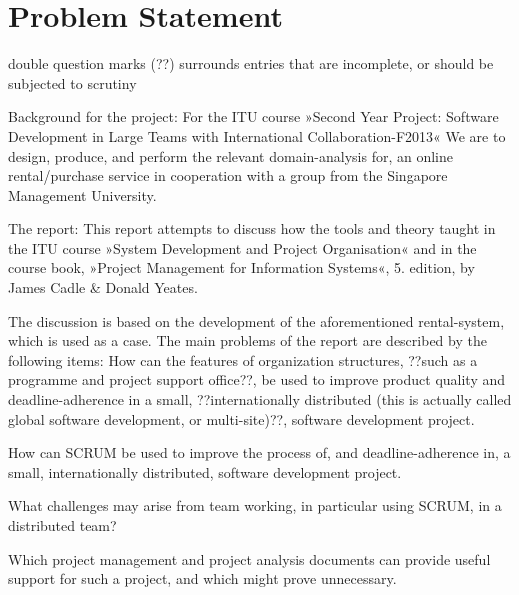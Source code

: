 \section{Problem Statement}
\label{sec:problemstatement}
double question marks (??) surrounds entries that are incomplete, or should be
subjected to scrutiny

Background for the project:
For the ITU course »Second Year Project: Software Development in Large Teams with
International Collaboration-F2013«
We are to design, produce, and perform the relevant domain-analysis for,
an online rental/purchase service in cooperation with a group from the Singapore
Management University.

The report:
This report attempts to discuss how the tools and theory taught in the
ITU course »System Development and Project Organisation« and in the
course book, »Project Management for Information Systems«, 5. edition, by 
James Cadle & Donald Yeates.

The discussion is based on the development of the aforementioned
rental-system, which is used as a case.
The main problems of the report are described by the following items:
How can the features of organization structures, ??such as a
programme and project support office??, be used to improve
product quality and deadline-adherence in a small,
??internationally distributed (this is actually called global
software development, or multi-site)??,  software development project.

How can SCRUM be used to improve the process of, and 
deadline-adherence in, a small, internationally distributed,
software development project.

What challenges may arise from team working, in particular
using SCRUM, in a distributed team?

Which project management and project analysis documents can
provide useful support for such a project, and which might
prove unnecessary.
